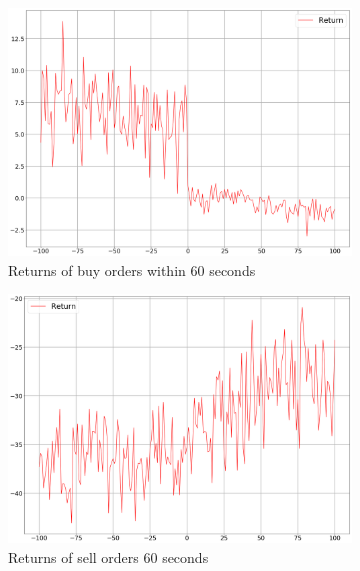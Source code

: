 \begin{figure}[H]
\begin{subfigure}[b]{0.45\textwidth}
        \includegraphics[width=\textwidth]{images/behaviour-60s-buy.png}
        \caption{Returns of buy orders within 60 seconds}
        \label{fig:behvaiour-down-60s-buy}
    \end{subfigure}
    \begin{subfigure}[b]{0.45\textwidth}
        \includegraphics[width=\textwidth]{images/behaviour-60s-sell.png}
        \caption{Returns of sell orders 60 seconds}
        \label{fig:behvaiour-down-60s-sell}
    \end{subfigure}
    \begin{subfigure}[b]{0.45\textwidth}

\end{subfigure}
\end{figure}
